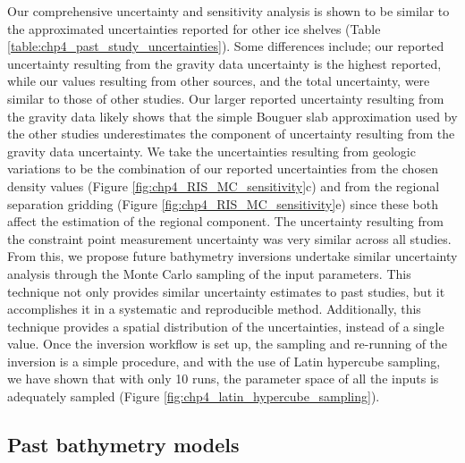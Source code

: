 Our comprehensive uncertainty and sensitivity analysis is shown to be similar to the approximated uncertainties reported for other ice shelves (Table \ref{table:chp4_past_study_uncertainties}). Some differences include; our reported uncertainty resulting from the gravity data uncertainty is the highest reported, while our values resulting from other sources, and the total uncertainty, were similar to those of other studies. Our larger reported uncertainty resulting from the gravity data likely shows that the simple Bouguer slab approximation used by the other studies underestimates the component of uncertainty resulting from the gravity data uncertainty. We take the uncertainties resulting from geologic variations to be the combination of our reported uncertainties from the chosen density values (Figure \ref{fig:chp4_RIS_MC_sensitivity}c) and from the regional separation gridding (Figure \ref{fig:chp4_RIS_MC_sensitivity}e) since these both affect the estimation of the regional component. The uncertainty resulting from the constraint point measurement uncertainty was very similar across all studies.\\

From this, we propose future bathymetry inversions undertake similar uncertainty analysis through the Monte Carlo sampling of the input parameters. This technique not only provides similar uncertainty estimates to past studies, but it accomplishes it in a systematic and reproducible method. Additionally, this technique provides a spatial distribution of the uncertainties, instead of a single value. Once the inversion workflow is set up, the sampling and re-running of the inversion is a simple procedure, and with the use of Latin hypercube sampling, we have shown that with only 10 runs, the parameter space of all the inputs is adequately sampled (Figure \ref{fig:chp4_latin_hypercube_sampling}).\\

\subsection{Past bathymetry models}

